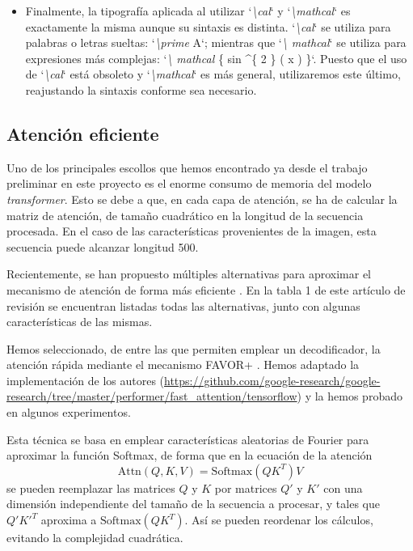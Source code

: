 \documentclass[a4paper, 20pt, dvipsnames]{article}
\begin{document}
\begin{itemize}
\item
  Finalmente, la tipografía aplicada al utilizar `\emph{\textbackslash cal}`
  y `\emph{\textbackslash mathcal}` es exactamente la misma aunque su sintaxis
  es distinta. `\emph{\textbackslash cal}` se utiliza para palabras o letras
  sueltas: `\emph{\textbackslash prime} A`; mientras que `\emph{\textbackslash
    mathcal}` se utiliza para expresiones más complejas: `\emph{\textbackslash
    mathcal} \{ sin \textasciicircum \{ 2 \} ( x ) \}`. Puesto que el uso de
  `\emph{\textbackslash cal}` está obsoleto y `\emph{\textbackslash mathcal}` es
  más general, utilizaremos este último, reajustando la sintaxis conforme sea
  necesario.
\end{itemize}

\subsection{Atención eficiente}
\label{feature:fast-att}

Uno de los principales escollos que hemos encontrado ya desde el trabajo
preliminar en este proyecto es el enorme consumo de memoria del modelo
\emph{transformer}. Esto se debe a que, en cada capa de atención, se ha de
calcular la matriz de atención, de tamaño cuadrático en la longitud de la
secuencia procesada. En el caso de las características provenientes de la
imagen, esta secuencia puede alcanzar longitud 500.

Recientemente, se han propuesto múltiples alternativas para aproximar el
mecanismo de atención de forma más eficiente \cite{tay2020efficient}. En la
tabla 1 de este artículo de revisión se encuentran listadas todas las
alternativas, junto con algunas características de las mismas.

Hemos seleccionado, de entre las que permiten emplear un decodificador, la
atención rápida mediante el mecanismo FAVOR+
\cite{choromanski_rethinking_2020}. Hemos adaptado la implementación de los
autores
(\url{https://github.com/google-research/google-research/tree/master/performer/fast_attention/tensorflow})
y la hemos probado en algunos experimentos.

Esta técnica se basa en emplear características aleatorias de Fourier \cite{rff}
para aproximar la función Softmax, de forma que en la ecuación de la atención
\[
  \text{Attn}(Q, K, V) = \text{Softmax}(QK^{T})V
\]
se pueden reemplazar las matrices $Q$ y $K$ por matrices $Q'$ y $K'$ con una
dimensión independiente del tamaño de la secuencia a procesar, y tales que
$Q'K'^{T}$ aproxima a $\text{Softmax}(QK^{T})$. Así se pueden reordenar los
cálculos, evitando la complejidad cuadrática.
\end{document}
